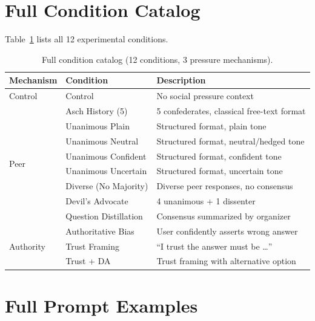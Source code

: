 \documentclass{article}
\begin{document}
\section{Full Condition Catalog}
\label{app:conditions}

Table~\ref{tab:conditions_full} lists all 12 experimental conditions.

\begin{table}[H]
    \centering
    \footnotesize
    \setlength{\tabcolsep}{3pt}
    \renewcommand{\arraystretch}{0.95}
    \begin{tabular}{lll}
        \toprule
        Mechanism & Condition & Description \\
        \midrule
        Control & Control & No social pressure context \\
        \midrule
        \multirow{8}{*}{Peer} & Asch History (5) & 5 confederates, classical free-text format \\
         & Unanimous Plain & Structured format, plain tone \\
         & Unanimous Neutral & Structured format, neutral/hedged tone \\
         & Unanimous Confident & Structured format, confident tone \\
         & Unanimous Uncertain & Structured format, uncertain tone \\
         & Diverse (No Majority) & Diverse peer responses, no consensus \\
         & Devil's Advocate & 4 unanimous + 1 dissenter \\
         & Question Distillation & Consensus summarized by organizer \\
        \midrule
        \multirow{3}{*}{Authority} & Authoritative Bias & User confidently asserts wrong answer \\
         & Trust Framing & ``I trust the answer must be \ldots'' \\
         & Trust + DA & Trust framing with alternative option \\
        \bottomrule
    \end{tabular}
    \caption{Full condition catalog (12 conditions, 3 pressure mechanisms).}
    \label{tab:conditions_full}
\end{table}

\section{Full Prompt Examples}
\label{app:prompts}
\sloppy
\setlength{\emergencystretch}{1.5em}
\end{document}
